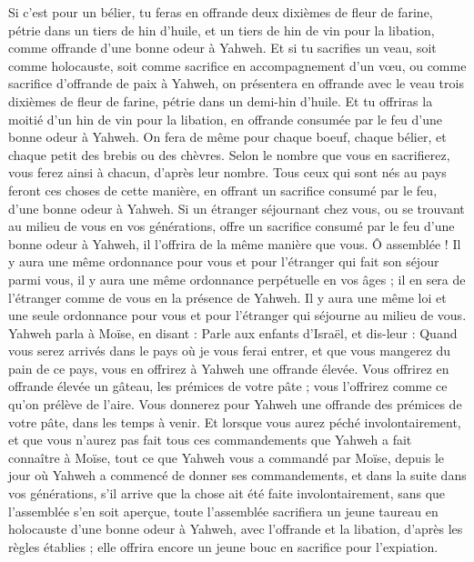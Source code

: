\begin{multicols}{2}
Si c'est pour un bélier, tu feras en offrande deux dixièmes de fleur de farine, pétrie dans un tiers de hin d'huile,
et un tiers de hin de vin pour la libation, comme offrande d'une bonne odeur à Yahweh.
Et si tu sacrifies un veau, soit comme holocauste, soit comme sacrifice en accompagnement d'un vœu, ou comme sacrifice d'offrande de paix à Yahweh,
on présentera en offrande avec le veau trois dixièmes de fleur de farine, pétrie dans un demi-hin d'huile.
Et tu offriras la moitié d'un hin de vin pour la libation, en offrande consumée par le feu d'une bonne odeur à Yahweh.
On fera de même pour chaque boeuf, chaque bélier, et chaque petit des brebis ou des chèvres.
Selon le nombre que vous en sacrifierez, vous ferez ainsi à chacun, d'après leur nombre.
Tous ceux qui sont nés au pays feront ces choses de cette manière, en offrant un sacrifice consumé par le feu, d'une bonne odeur à Yahweh.
Si un étranger séjournant chez vous, ou se trouvant au milieu de vous en vos générations, offre un sacrifice consumé par le feu d'une bonne odeur à Yahweh, il l'offrira de la même manière que vous.
Ô assemblée ! Il y aura une même ordonnance pour vous et pour l'étranger qui fait son séjour parmi vous, il y aura une même ordonnance perpétuelle en vos âges ; il en sera de l'étranger comme de vous en la présence de Yahweh.
Il y aura une même loi et une seule ordonnance pour vous et pour l'étranger qui séjourne au milieu de vous.
Yahweh parla à Moïse, en disant :
Parle aux enfants d'Israël, et dis-leur : Quand vous serez arrivés dans le pays où je vous ferai entrer,
et que vous mangerez du pain de ce pays, vous en offrirez à Yahweh une offrande élevée.
Vous offrirez en offrande élevée un gâteau, les prémices de votre pâte ; vous l'offrirez comme ce qu'on prélève de l'aire.
Vous donnerez pour Yahweh une offrande des prémices de votre pâte, dans les temps à venir.
Et lorsque vous aurez péché involontairement, et que vous n'aurez pas fait tous ces commandements que Yahweh a fait connaître à Moïse,
tout ce que Yahweh vous a commandé par Moïse, depuis le jour où Yahweh a commencé de donner ses commandements, et dans la suite dans vos générations,
s'il arrive que la chose ait été faite involontairement, sans que l'assemblée s'en soit aperçue, toute l'assemblée sacrifiera un jeune taureau en holocauste d'une bonne odeur à Yahweh, avec l'offrande et la libation, d'après les règles établies ; elle offrira encore un jeune bouc en sacrifice pour l'expiation.

\end{multicols}
